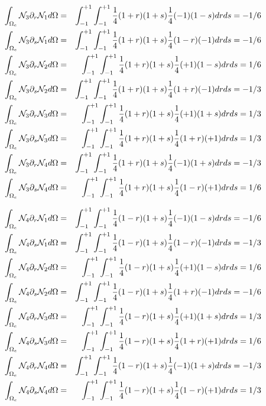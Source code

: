 \begin{tiny}
\begin{eqnarray}
\int_{\Omega_e}  {\mathcal{N}}_3\partial_r {\mathcal{N}}_1 d\Omega&=& \int_{-1}^{+1}\int_{-1}^{+1} \frac{1}{4}(1+r)(1+s) \frac{1}{4}(-1)(1-s) dr ds = -1/6 \nonumber\\
\int_{\Omega_e}  {\mathcal{N}}_3\partial_s {\mathcal{N}}_1 d\Omega&=& \int_{-1}^{+1}\int_{-1}^{+1} \frac{1}{4}(1+r)(1+s) \frac{1}{4}(1-r)(-1) dr ds = -1/6 \nonumber\\
\int_{\Omega_e}  {\mathcal{N}}_3\partial_r {\mathcal{N}}_2 d\Omega&=& \int_{-1}^{+1}\int_{-1}^{+1} \frac{1}{4}(1+r)(1+s) \frac{1}{4}(+1)(1-s) dr ds = 1/6 \nonumber\\
\int_{\Omega_e}  {\mathcal{N}}_3\partial_s {\mathcal{N}}_2 d\Omega&=& \int_{-1}^{+1}\int_{-1}^{+1} \frac{1}{4}(1+r)(1+s) \frac{1}{4}(1+r)(-1) dr ds = -1/3 \nonumber\\
\int_{\Omega_e}  {\mathcal{N}}_3\partial_r {\mathcal{N}}_3 d\Omega&=& \int_{-1}^{+1}\int_{-1}^{+1} \frac{1}{4}(1+r)(1+s) \frac{1}{4}(+1)(1+s) dr ds = 1/3 \nonumber\\
\int_{\Omega_e}  {\mathcal{N}}_3\partial_s {\mathcal{N}}_3 d\Omega&=& \int_{-1}^{+1}\int_{-1}^{+1} \frac{1}{4}(1+r)(1+s) \frac{1}{4}(1+r)(+1) dr ds = 1/3  \nonumber\\
\int_{\Omega_e}  {\mathcal{N}}_3\partial_r {\mathcal{N}}_4 d\Omega&=& \int_{-1}^{+1}\int_{-1}^{+1} \frac{1}{4}(1+r)(1+s) \frac{1}{4}(-1)(1+s) dr ds = -1/3 \nonumber\\
\int_{\Omega_e}  {\mathcal{N}}_3\partial_s {\mathcal{N}}_4 d\Omega&=& \int_{-1}^{+1}\int_{-1}^{+1} \frac{1}{4}(1+r)(1+s) \frac{1}{4}(1-r)(+1) dr ds = 1/6 \nonumber
\end{eqnarray}

\begin{eqnarray}
\int_{\Omega_e}  {\mathcal{N}}_4\partial_r {\mathcal{N}}_1 d\Omega&=& \int_{-1}^{+1}\int_{-1}^{+1} \frac{1}{4}(1-r)(1+s) \frac{1}{4}(-1)(1-s) dr ds = -1/6 \nonumber\\
\int_{\Omega_e}  {\mathcal{N}}_4\partial_s {\mathcal{N}}_1 d\Omega&=& \int_{-1}^{+1}\int_{-1}^{+1} \frac{1}{4}(1-r)(1+s) \frac{1}{4}(1-r)(-1) dr ds = -1/3 \nonumber\\
\int_{\Omega_e}  {\mathcal{N}}_4\partial_r {\mathcal{N}}_2 d\Omega&=& \int_{-1}^{+1}\int_{-1}^{+1} \frac{1}{4}(1-r)(1+s) \frac{1}{4}(+1)(1-s) dr ds = 1/6 \nonumber\\
\int_{\Omega_e}  {\mathcal{N}}_4\partial_s {\mathcal{N}}_2 d\Omega&=& \int_{-1}^{+1}\int_{-1}^{+1} \frac{1}{4}(1-r)(1+s) \frac{1}{4}(1+r)(-1) dr ds = -1/6\nonumber\\
\int_{\Omega_e}  {\mathcal{N}}_4\partial_r {\mathcal{N}}_3 d\Omega&=& \int_{-1}^{+1}\int_{-1}^{+1} \frac{1}{4}(1-r)(1+s) \frac{1}{4}(+1)(1+s) dr ds =  1/3 \nonumber\\
\int_{\Omega_e}  {\mathcal{N}}_4\partial_s {\mathcal{N}}_3 d\Omega&=& \int_{-1}^{+1}\int_{-1}^{+1} \frac{1}{4}(1-r)(1+s) \frac{1}{4}(1+r)(+1) dr ds = 1/6  \nonumber\\
\int_{\Omega_e}  {\mathcal{N}}_4\partial_r {\mathcal{N}}_4 d\Omega&=& \int_{-1}^{+1}\int_{-1}^{+1} \frac{1}{4}(1-r)(1+s) \frac{1}{4}(-1)(1+s) dr ds = -1/3 \nonumber\\
\int_{\Omega_e}  {\mathcal{N}}_4\partial_s {\mathcal{N}}_4 d\Omega&=& \int_{-1}^{+1}\int_{-1}^{+1} \frac{1}{4}(1-r)(1+s) \frac{1}{4}(1-r)(+1) dr ds = 1/3 \nonumber
\end{eqnarray}

\end{tiny}

